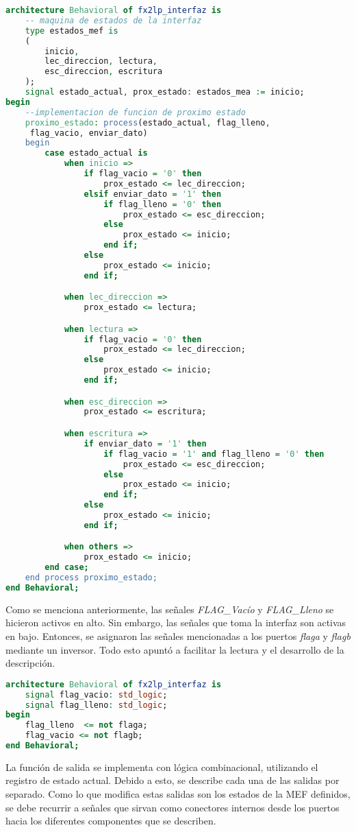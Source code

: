 \begin{lstlisting}[language=VHDL,backgroundcolor=\color{gray!30}]
architecture Behavioral of fx2lp_interfaz is
	-- maquina de estados de la interfaz
	type estados_mef is
	(
		inicio,
		lec_direccion, lectura,
		esc_direccion, escritura
	);
	signal estado_actual, prox_estado: estados_mea := inicio;
begin
	--implementacion de funcion de proximo estado
	proximo_estado: process(estado_actual, flag_lleno,
	 flag_vacio, enviar_dato)
	begin
		case estado_actual is
			when inicio =>
				if flag_vacio = '0' then
					prox_estado <= lec_direccion;
				elsif enviar_dato = '1' then
					if flag_lleno = '0' then
						prox_estado <= esc_direccion;
					else
						prox_estado <= inicio;
					end if;
				else
					prox_estado <= inicio;
				end if;

			when lec_direccion =>
				prox_estado <= lectura;

			when lectura =>
				if flag_vacio = '0' then
					prox_estado <= lec_direccion;
				else
					prox_estado <= inicio;
				end if;

			when esc_direccion =>
				prox_estado <= escritura;

			when escritura =>
				if enviar_dato = '1' then
					if flag_vacio = '1' and flag_lleno = '0' then
						prox_estado <= esc_direccion;
					else
						prox_estado <= inicio;
					end if;
				else
					prox_estado <= inicio;
				end if;

			when others =>
				prox_estado <= inicio;
		end case;
	end process proximo_estado;
end Behavioral;
\end{lstlisting}

Como se menciona anteriormente, las señales {\it FLAG\_Vacío} y {\it FLAG\_Lleno} se hicieron activos en alto. Sin embargo, las señales que toma la interfaz son activas en bajo. Entonces, se asignaron las señales mencionadas a los puertos {\it flaga} y {\it flagb} mediante un inversor. Todo esto apuntó a facilitar la lectura y el desarrollo de la descripción.

\begin{lstlisting}[language=VHDL,backgroundcolor=\color{gray!30}]
architecture Behavioral of fx2lp_interfaz is
	signal flag_vacio: std_logic;
	signal flag_lleno: std_logic;
begin
	flag_lleno  <= not flaga;
	flag_vacio <= not flagb;
end Behavioral;	
\end{lstlisting}

La función de salida se implementa con lógica combinacional, utilizando el registro de estado actual. Debido a esto, se describe cada una de las salidas por separado. Como lo que modifica estas salidas son los estados de la MEF definidos, se debe recurrir a señales que sirvan como conectores internos desde los puertos hacia los diferentes componentes que se describen.

